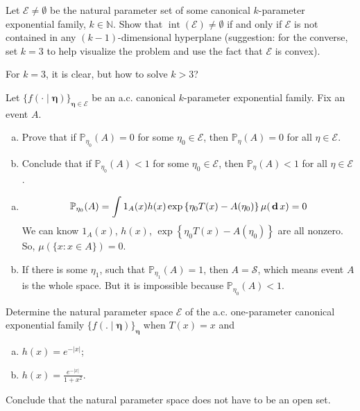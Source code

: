 \begin{exercise}
    Let \(\mathcal{E} \neq \emptyset\) be the natural parameter set of some canonical \(k\)-parameter exponential family, \(k \in \mathbb{N}\). Show that \(\operatorname{int}(\mathcal{E}) \neq \emptyset\) if and only if \(\mathcal{E}\) is not contained in any \((k-1)\)-dimensional hyperplane (suggestion: for the converse, set \(k=3\) to help visualize the problem and use the fact that \(\mathcal{E}\) is convex).
\end{exercise}

\begin{solution}
    For $k=3$, it is clear, but how to solve $k>3$? 
\end{solution}

\begin{exercise}
    Let \(\{f(\cdot \mid \boldsymbol{\eta})\}_{\boldsymbol{\eta} \in \mathcal{E}}\) be an a.c. canonical \(k\)-parameter exponential family. Fix an event \(A\). 
    \begin{enumerate}[(a)]
        \item Prove that if \(\mathbb{P}_{\eta_{0}}(A)=0\) for some \(\eta_{0} \in \mathcal{E}\), then \(\mathbb{P}_{\eta}(A)=0\) for all \(\eta \in \mathcal{E}\). 
        \item Conclude that if \(\mathbb{P}_{\eta_{0}}(A)<1\) for some \(\eta_{0} \in \mathcal{E}\), then \(\mathbb{P}_{\eta}(A)<1\) for all \(\eta \in \mathcal{E}\).
    \end{enumerate}
\end{exercise}

\begin{solution}
    \begin{enumerate}[(a)]
        \item \[\mathbb{P}_{\eta_0}(A)=\int1_{A}(x)h(x)\exp\left\{\eta_0T(x)-A(\eta_0)\right\}\mu(\,\mathbf{d}\, x)=0\]
        We can know $1_{A}(x)$, $h(x)$, $\exp\left\{\eta_0T(x)-A(\eta_0)\right\}$ are all nonzero. So, $\mu(\{x:x\in A\})=0$. 
        \item If there is some $\eta_1$, such that $\mathbb{P}_{\eta_1}(A)=1$, then $A=\mathcal{S}$, which means event $A$ is the whole space. But it is impossible because $\mathbb{P}_{\eta_0}(A)<1$. 
    \end{enumerate}
\end{solution}

\begin{exercise}
    Determine the natural parameter space \(\mathcal{E}\) of the a.c. one-parameter canonical exponential family \(\{f(. \mid \boldsymbol{\eta})\}_{\boldsymbol{\eta}}\) when \(T(x)=x\) and
    \begin{enumerate}[(a)]
        \item \(h(x)=e^{-|x|}\);
        \item \(h(x)=\frac{e^{-|x|}}{1+x^{2}}\).
    \end{enumerate}
    Conclude that the natural parameter space does not have to be an open set.
\end{exercise}


